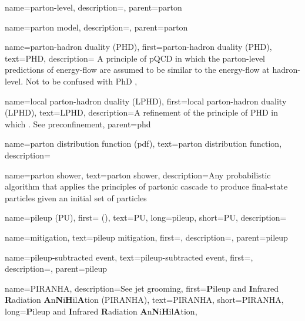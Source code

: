     {
      name=parton-level,
      description={},
      parent=parton
    }

    {
      name=parton model,
      description={},
      parent=parton
    }


{
  name=parton-hadron duality (PHD),
  first=parton-hadron duality (PHD),
  text=PHD,
  description={
      A principle of pQCD in which the parton-level predictions of energy-flow are assumed to be similar to the energy-flow at hadron-level.
      Not to be confused with PhD 
  },
}

    {
      name=local parton-hadron duality (LPHD),
      first=local parton-hadron duality (LPHD),
      text=LPHD,
      description={A refinement of the principle of PHD in which \sam{}.
      See preconfinement},
      parent=phd
    }




{
  name=parton distribution function (pdf),
  text=parton distribution function,
  description={}
}



{
  name=parton shower,
  text=parton shower,
  description={Any probabilistic algorithm that applies the principles of partonic cascade to produce final-state particles given an initial set of particles}
}


{
  name=pileup (PU),
  first= (),
  text=PU,
  long=pileup,
  short=PU,
  description={}
}

    {
      name=mitigation,
      text=pileup mitigation,
      first=,
      description={},
      parent=pileup
    }

    {
      name=pileup-subtracted event,
      text=pileup-subtracted event,
      first=,
      description={},
      parent=pileup
    }

{
    name=PIRANHA,
    description={See jet grooming},
    first={\textbf{P}ileup and \textbf{I}nfrared \textbf{R}adiation \textbf{A}n\textbf{N}i\textbf{H}il\textbf{A}tion (PIRANHA)},
    text={PIRANHA},
    short={PIRANHA},
    long={\textbf{P}ileup and \textbf{I}nfrared \textbf{R}adiation \textbf{A}n\textbf{N}i\textbf{H}il\textbf{A}tion},
}


